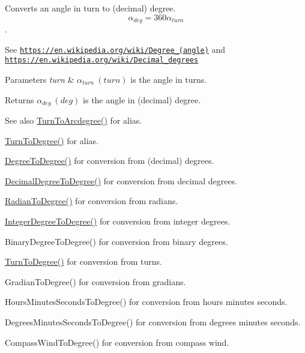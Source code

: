Converts an angle in turn to (decimal) degree. \[\alpha_{deg}=360\alpha_{turn}\]. 

See \href{https://en.wikipedia.org/wiki/Degree_(angle)}{\tt https\+://en.\+wikipedia.\+org/wiki/\+Degree\+\_\+(angle)} and \href{https://en.wikipedia.org/wiki/Decimal_degrees}{\tt https\+://en.\+wikipedia.\+org/wiki/\+Decimal\+\_\+degrees} 
\begin{DoxyParams}{Parameters}
{\em turn} & $\alpha_{turn}\ (turn)$ is the angle in turns. \\
\hline
\end{DoxyParams}
\begin{DoxyReturn}{Returns}
$\alpha_{deg}\ (deg)$ is the angle in (decimal) degree. 
\end{DoxyReturn}
\begin{DoxySeeAlso}{See also}
\mbox{\hyperlink{group___e_g_x_math-_angle_conversions-_turn_ga7bdc3a81ce316dd47b1a3179489fa195}{Turn\+To\+Arcdegree()}} for alias. 

\mbox{\hyperlink{group___e_g_x_math-_angle_conversions-_turn_ga19eceb6db54a1cf17789639c2a869cb9}{Turn\+To\+Degree()}} for alias. 

\mbox{\hyperlink{group___e_g_x_math-_angle_conversions-_degree_gaca157e7d3e99a46a11a04b92680d2574}{Degree\+To\+Degree()}} for conversion from (decimal) degrees. 

\mbox{\hyperlink{group___e_g_x_math-_angle_conversions-_decimal_degree_ga0aa7f2f5dbb00cf4ab303421c6e33ccf}{Decimal\+Degree\+To\+Degree()}} for conversion from decimal degrees. 

\mbox{\hyperlink{group___e_g_x_math-_angle_conversions-_radian_ga25bbce6cdc1c3621f2a158d320e3bc45}{Radian\+To\+Degree()}} for conversion from radians. 

\mbox{\hyperlink{group___e_g_x_math-_angle_conversions-_integer_degree_gaa9b63c6095fd7f8809fcfa2ba1e62235}{Integer\+Degree\+To\+Degree()}} for conversion from integer degrees. 

Binary\+Degree\+To\+Degree() for conversion from binary degrees. 

\mbox{\hyperlink{group___e_g_x_math-_angle_conversions-_turn_ga19eceb6db54a1cf17789639c2a869cb9}{Turn\+To\+Degree()}} for conversion from turns. 

Gradian\+To\+Degree() for conversion from gradians. 

Hours\+Minutes\+Seconds\+To\+Degree() for conversion from hours minutes seconds. 

Degrees\+Minutes\+Seconds\+To\+Degree() for conversion from degrees minutes seconds. 

Compass\+Wind\+To\+Degree() for conversion from compass wind. 
\end{DoxySeeAlso}
\mbox{\label{group___e_g_x_math-_angle_conversions-_turn_gaefdee18d878c2e66e7bd737c8900ab30}} 
